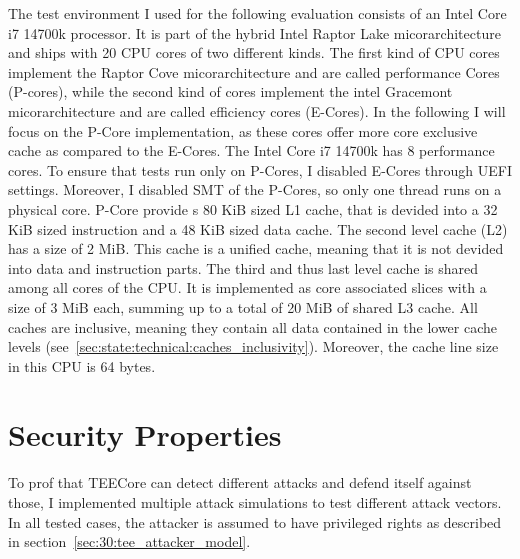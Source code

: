 The test environment I used for the following evaluation consists of an Intel
Core i7 14700k processor. It is part of the hybrid Intel Raptor Lake
micorarchitecture and ships with 20 CPU cores of two different kinds. The first
kind of CPU cores implement the Raptor Cove micorarchitecture and are called
performance Cores (P-cores), while the second kind of cores implement the intel
Gracemont micorarchitecture and are called efficiency cores (E-Cores). In the
following I will focus on the P-Core implementation, as these cores offer more
core exclusive cache as compared to the E-Cores. The Intel Core i7 14700k has 8
performance cores. To ensure that tests run only on P-Cores, I disabled E-Cores
through UEFI settings. Moreover, I disabled SMT of the P-Cores, so only one
thread runs on a physical core. P-Core provide s 80 KiB sized L1 cache, that is
devided into a 32 KiB sized instruction and a 48 KiB sized data cache. The
second level cache (L2) has a size of 2 MiB. This cache is a unified cache,
meaning that it is not devided into data and instruction parts. The third and
thus last level cache is shared among all cores of the CPU. It is implemented as
core associated slices with a size of 3 MiB each, summing up to a total of 20
MiB of shared L3 cache. All caches are inclusive, meaning they contain all data
contained in the lower cache levels
(see~\ref{sec:state:technical:caches_inclusivity}). Moreover, the cache line
size in this CPU is 64 bytes.

\section{Security Properties}
To prof that TEECore can detect different attacks and defend itself against
those, I implemented multiple attack simulations to test different attack
vectors. In all tested cases, the attacker is assumed to have privileged rights
as described in section~\ref{sec:30:tee_attacker_model}.\\


